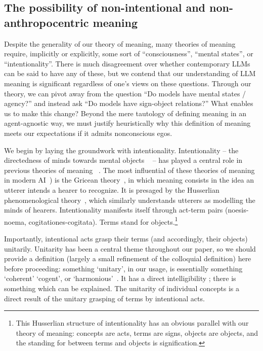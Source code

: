 
\subsection{The possibility of non-intentional and non-anthropocentric meaning}\label{appendix:possibility}
Despite the generality of our theory of meaning, many theories of meaning require, implicitly or explicitly, some sort of ``consciousness'', ``mental states'', or ``intentionality''. 
There is much disagreement over whether contemporary LLMs can be said to have any of these, but we contend that our understanding of LLM meaning is significant regardless of one's views on these questions.
Through our theory, we can pivot away from the question ``Do models have mental states / agency?'' and instead ask ``Do models have sign-object relations?''
What enables us to make this change?
Beyond the mere tautology of defining meaning in an agent-agnostic way, we must justify heuristically why this definition of meaning meets our expectations if it admits nonconscious egos.

We begin by laying the groundwork with intentionality. Intentionality -- the directedness of minds towards mental objects ~\citep{Brentano:PsychologyEmpiricalStandpoint} -- has played a central role in previous theories of meaning ~\citep{Dreyfus:Intentionality}. The most influential of these theories of meaning in modern AI~\citep{Andreas:LMsAMs, Bennett:ComputationMeaning}) is the Gricean theory~\citep{Grice:Meaning}, in which meaning consists in the idea an utterer intends a hearer to recognize. It is presaged by the Husserlian phenomenological theory~\citep{Husserl:CartesianMeditations}, which similarly understands utterers as modelling the minds of hearers. Intentionality manifests itself through act-term pairs (noesis-noema, cogitationes-cogitata). Terms stand for objects.\footnote{This Husserlian structure of intentionality has an obvious parallel with our theory of meaning: concepts are acts, terms are signs, objects are objects, and the standing for between terms and objects is signification.}

Importantly, intentional acts grasp their terms (and accordingly, their objects) unitarily. Unitarity has been a central theme throughout our paper, so we should provide a definition (largely a small refinement of the colloquial definition) here before proceeding: something `unitary', in our usage, is essentially something `coherent' `cogent', or `harmonious'~\citep{Husserl:CartesianMeditations}. It has a direct intelligibility \citep{Lonergan:Insight}; there is something which can be explained. The unitarity of individual concepts is a direct result of the unitary grasping of terms by intentional acts.

